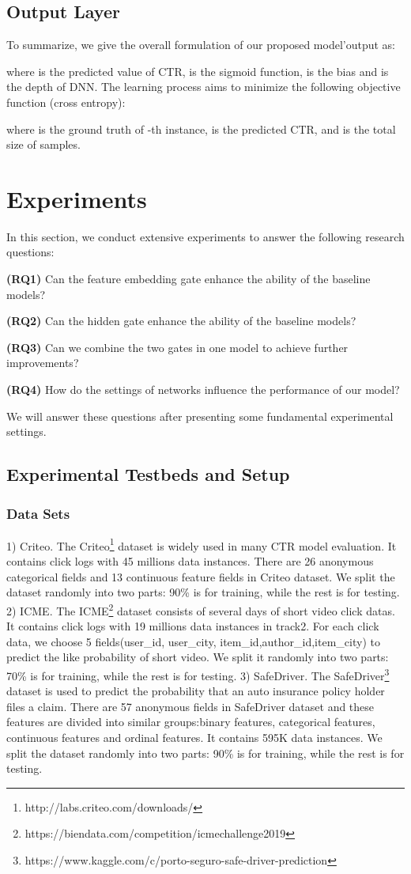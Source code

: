 \documentclass[sigconf,nonacm=true]{acmart}
\begin{document}
\subsection{Output Layer}
To summarize, we give the overall formulation of our proposed model'output as:

where  is the predicted value of CTR,  is the sigmoid function,  is the bias and  is the depth of DNN. The learning process aims to minimize the following objective function
(cross entropy):

where  is the ground truth of -th instance,  is
the predicted CTR, and  is the total size of samples.

\section{Experiments}
\label{sec:s4}
In this section, we conduct extensive experiments to answer the following research questions:

\noindent\textbf{(RQ1)} Can the feature embedding gate enhance the ability of the baseline models?

\noindent\textbf{(RQ2)} Can the hidden gate enhance the ability of the baseline models?

\noindent\textbf{(RQ3)} Can we combine the two gates in one model to achieve further improvements?

\noindent\textbf{(RQ4)} How do the settings of networks influence the performance of our model?

We will answer these questions after presenting some fundamental experimental settings.
\subsection{Experimental Testbeds and Setup}
\subsubsection{Data Sets} 1) Criteo.
The Criteo\footnote{http://labs.criteo.com/downloads/} dataset is widely used in many CTR model evaluation. 
It contains click logs with 45 millions data instances. 
There are 26 anonymous categorical fields and 13 continuous feature fields in Criteo dataset.
We split the dataset randomly into two parts: 90\% is for training,
while the rest is for testing. 2) ICME. The ICME\footnote{https://biendata.com/competition/icmechallenge2019}
dataset consists of several days of short video click datas. It contains click logs with 19 millions data instances in track2. 
For each click data, we choose 5 fields(user\_id, user\_city, item\_id,author\_id,item\_city) to predict the like probability of short video.
We split it randomly into two parts: 70\% is for training, while the rest is for testing. 3) SafeDriver. The SafeDriver\footnote{https://www.kaggle.com/c/porto-seguro-safe-driver-prediction}
dataset is used to predict the probability that an auto insurance policy holder files a claim.
There are 57 anonymous fields in SafeDriver dataset and these features are divided into similar groups:binary features, categorical features, continuous features and ordinal features. 
It contains 595K data instances. We split the dataset randomly into two parts: 90\% is for training, while the rest is for testing.
\end{document}
